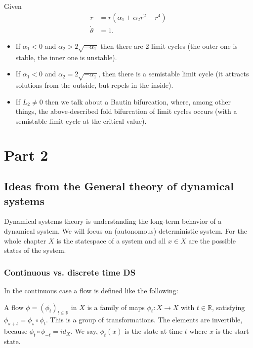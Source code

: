 \documentclass{article}
\newcommand*{\R}{\mathbb{R}}
\begin{document}
\begin{exam}
    Given
    $$\begin{aligned}
        \dot r &=r(\alpha_1+\alpha_2r^2-r^4)\\
        \dot \theta &= 1.
    \end{aligned}$$
    \begin{itemize}
        \item If $\alpha_1 < 0$ and $\alpha_2 > 2\sqrt{-\alpha_1}$ then there are 2 limit cycles (the outer one is stable, the inner one is unstable).

        \item If $\alpha_1<0$ and $\alpha_2 = 2\sqrt{-\alpha_1}$, then there is a semistable limit cycle (it attracts solutions from the outside, but repels in the inside).

        \item If $L_2\neq 0$ then we talk about a Bautin bifurcation, where, among other things, the above-described fold bifurcation of limit cycles occurs (with a semistable limit cycle at the critical value).
    \end{itemize}
\end{exam}

\section{Part 2}

\subsection{Ideas from the General theory of dynamical systems}

Dynamical systems theory is understanding the long-term behavior of a dynamical system. We will focus on (autonomous) deterministic system. For the whole chapter $X$ is the statespace of a system and all $x\in X$ are the possible states of the system.

\subsubsection{Continuous vs. discrete time DS}

In the continuous case a flow is defined like the following:

\begin{defin}
    \item A flow $\phi =(\phi_t)_{t\in\R}$ in $X$ is a family of maps $\phi_t:X\to X$ with $t\in \R$, satisfying $\phi_{s+t}=\phi_s\circ\phi_t$. This is a group of transformations. The elements are invertible, because $\phi_t\circ\phi_{-t}=id_X$. We say, $\phi_t(x)$ is the state at time $t$ where $x$ is the start state.
\end{defin}
\end{document}
